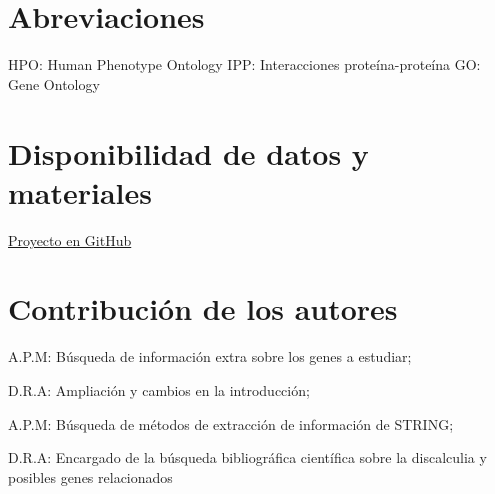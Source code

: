 \documentclass{bmcart}
\begin{document}
	\begin{backmatter}
	
		\section*{Abreviaciones}%
			HPO: Human Phenotype Ontology
			\hfill
			IPP: Interacciones proteína-proteína
			\hfill
			GO: Gene Ontology

		
		\section*{Disponibilidad de datos y materiales}%
			\href{https://github.com/Archerd6/Projecto_Biologia_de_Sistemas}{Proyecto en GitHub}
		
		\section*{Contribución de los autores}
		    
		    A.P.M:  Búsqueda de información extra sobre los genes a estudiar;
			\hfill
		    
		    D.R.A: Ampliación y cambios en la introducción;
		    \hfill
			
			A.P.M:  Búsqueda de métodos de extracción de información de STRING;
			\hfill
			
			D.R.A: Encargado de la búsqueda bibliográfica científica sobre la discalculia y posibles genes relacionados
		
		
		
	
	\end{backmatter}
\end{document}
